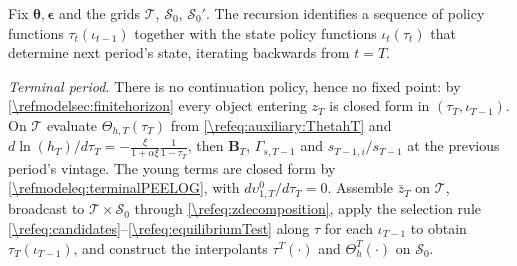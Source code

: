 \begin{alg}
\label{\refalg:LOG:gridsearch}
Fix $\bm{\theta},\bm{\epsilon}$ and the grids $\mathcal{T}$, $\mathcal{S}_0$, $\mathcal{S}_0'$. The recursion identifies a sequence of policy functions $\tau_t(\iota_{t-1})$ together with the state policy functions $\iota_t(\tau_t)$ that determine next period's state, iterating backwards from $t=T$.

\smallskip\noindent\emph{Terminal period.} There is no continuation policy, hence no fixed point: by \cref{\refmodelsec:finitehorizon} every object entering $z_T$ is closed form in $(\tau_T,\iota_{T-1})$. On $\mathcal{T}$ evaluate $\Theta_{h,T}(\tau_T)$ from \eqref{\refeq:auxiliary:ThetahT} and $d\ln(h_T)/d\tau_T = -\frac{\xi}{1+\alpha\xi}\frac{1}{1-\tau_T}$, then $\bm{B}_T$, $\Gamma_{s,T-1}$ and $s_{T-1,i}/s_{T-1}$ at the previous period's vintage. The young terms are closed form by \eqref{\refmodeleq:terminalPEELOG}, with $d\upsilon_{1,T}^0/d\tau_T = 0$. Assemble $\bar{z}_T$ on $\mathcal{T}$, broadcast to $\mathcal{T}\times\mathcal{S}_0$ through \eqref{\refeq:zdecomposition}, apply the selection rule \eqref{\refeq:candidates}--\eqref{\refeq:equilibriumTest} along $\tau$ for each $\iota_{T-1}$ to obtain $\tau_T(\iota_{T-1})$, and construct the interpolants $\tau^T(\cdot)$ and $\Theta_h^T(\cdot)$ on $\mathcal{S}_0$.


\end{alg}
